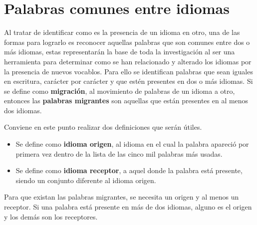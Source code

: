 \section{Palabras comunes entre idiomas}

Al tratar de identificar como es la presencia de un idioma en otro, una de las formas para lograrlo es reconocer aquellas palabras que son comunes entre dos o más idiomas,  estas representarán la base de toda la investigación al ser una herramienta para determinar como se han relacionado y alterado los idiomas por la presencia de nuevos vocablos.  Para ello se identifican palabras que sean iguales en escritura, carácter por carácter y
que estén presentes en dos o más idiomas.  Si se define como
\textbf{migración}, al movimiento de palabras de un idioma a otro, entonces las
\textbf{palabras migrantes}  son aquellas que están presentes en al
menos dos idiomas.  

Conviene en este punto realizar dos definiciones que serán
útiles.
{}
\begin{itemize}
\item 
Se define como  \textbf{idioma origen}, al idioma en el cual la palabra
apareció por primera vez dentro de la lista de las cinco mil palabras más
usadas.  

\item 
Se define como \textbf{idioma receptor}, a  aquel donde la palabra está
presente, siendo un conjunto diferente al idioma origen.  
\end{itemize}


Para que existan las palabras migrantes, se necesita un origen y al menos un
receptor. Si una palabra está presente en más de dos idiomas, alguno es el
origen y los demás son los receptores. 

